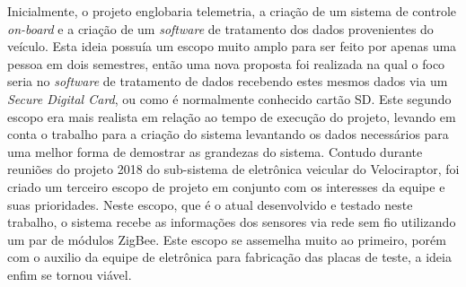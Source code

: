 Inicialmente, o projeto englobaria telemetria, a criação de um sistema de controle \textit{on-board} e a criação de um \textit{software} de tratamento dos dados provenientes do veículo. Esta ideia possuía um escopo muito amplo para ser feito por apenas uma pessoa em dois semestres, então uma nova proposta foi realizada na qual o foco seria no \textit{software} de tratamento de dados recebendo estes mesmos dados via um \textit{Secure Digital Card}, ou como é normalmente conhecido cartão SD. Este segundo escopo era mais realista em relação ao tempo de execução do projeto, levando em conta o trabalho para a criação do sistema levantando os dados necessários para uma melhor forma de demostrar as grandezas do sistema. Contudo durante reuniões do projeto 2018 do sub-sistema de eletrônica veicular do Velociraptor, foi criado um terceiro escopo de projeto em conjunto com os interesses da equipe e suas prioridades. Neste escopo, que é o atual desenvolvido e testado neste trabalho, o sistema recebe as informações dos sensores via rede sem fio utilizando um par de módulos ZigBee. Este escopo se assemelha muito ao primeiro, porém com o auxilio da equipe de eletrônica para fabricação das placas de teste, a ideia enfim se tornou viável.
